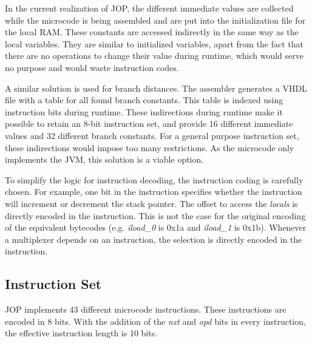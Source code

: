 In the current realization of JOP, the different immediate values
are collected while the microcode is being assembled and are put
into the initialization file for the local RAM. These constants are
accessed indirectly in the same way as the local variables. They are
similar to initialized variables, apart from the fact that there are
no operations to change their value during runtime, which would
serve no purpose and would waste instruction codes.

A similar solution is used for branch distances. The assembler
generates a VHDL file with a table for all found branch constants.
This table is indexed using instruction bits during runtime. These
indirections during runtime make it possible to retain an 8-bit
instruction set, and provide 16 different immediate values and 32
different branch constants. For a general purpose instruction set,
these indirections would impose too many restrictions. As the
microcode only implements the JVM, this solution is a viable option.

To simplify the logic for instruction decoding, the instruction
coding is carefully chosen. For example, one bit in the instruction
specifies whether the instruction will increment or decrement the
stack pointer. The offset to access the \emph{locals} is directly
encoded in the instruction. This is not the case for the original
encoding of the equivalent bytecodes (e.g. \emph{iload\_0} is 0x1a
and \emph{iload\_1} is 0x1b). Whenever a multiplexer depends on an
instruction, the selection is directly encoded in the instruction.

\subsection{Instruction Set}

JOP implements 43 different microcode instructions. These
instructions are encoded in 8 bits. With the addition of the
\emph{nxt} and \emph{opd} bits in every instruction, the effective
instruction length is 10 bits.

